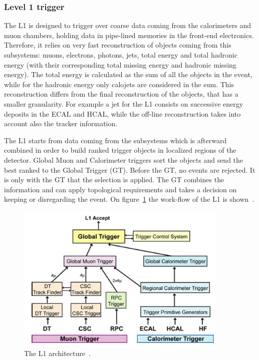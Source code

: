 \subsubsection{Level 1 trigger}
\label{sec:L1}

The L1 is designed to trigger over coarse data coming from the calorimeters and muon chambers, holding data in pipe-lined memories in the front-end electronics. Therefore, it relies on very fast reconstruction of objects coming from this subsystems: muons, electrons, photons, jets, total energy and total hadronic energy (with their corresponding total missing energy and hadronic missing energy). The total energy is calculated as the sum of all the objects in the event, while for the hadronic energy only calojets are considered in the sum. This reconstruction differs from the final reconstruction of the objects, that has a smaller granularity. For example a jet for the L1 consists on successive energy deposits in the ECAL and HCAL, while the off-line reconstruction takes into account also the tracker information. 

The L1 starts from data coming from the subsystems which is afterward combined in order to build ranked trigger objects in localized regions of the detector. Global Muon and Calorimeter triggers sort the objects and send the best ranked to the Global Trigger (GT). Before the GT, no events are rejected. It is only with the GT that the selection is applied. The GT combines the information and can apply topological requirements and takes a decision on keeping or disregarding the event. On figure~\ref{fig:l1} the work-flow of the L1 is shown~\cite{Lenzi:2013xpa}. 

\begin{figure}[!Hhtbp]
  \begin{center}
    \includegraphics[width=0.9\textwidth]{figs/img_l1.png}
    \caption{The L1 architecture~\cite{Lenzi:2013xpa}.}
    \label{fig:l1}
  \end{center}
\end{figure}

